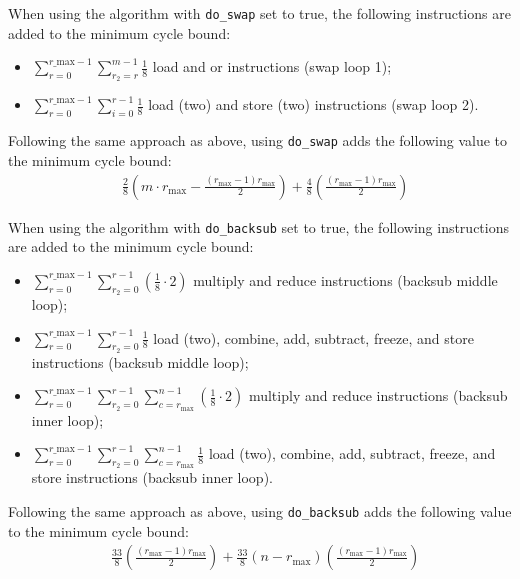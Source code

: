 \documentclass[11pt,a4paper]{report}
\theoremstyle{definition}
\begin{document}
When using the algorithm with \texttt{do\_swap} set to true, the following instructions are added to the minimum cycle bound:
\begin{itemize}
  \item $\sum_{r=0}^{r\_\text{max}-1} \sum_{r_2=r}^{m-1} \frac{1}{8}$ load and or instructions (swap loop 1);
  \item $\sum_{r=0}^{r\_\text{max}-1} \sum_{i=0}^{r-1} \frac{1}{8}$ load (two) and store (two) instructions (swap loop 2).
\end{itemize}
Following the same approach as above, using \texttt{do\_swap} adds the following value to the minimum cycle bound:
\begin{align*}
   & \frac{2}{8} \left( m \cdot r_\text{max} - \frac{(r_\text{max} - 1)r_{\text{max}}}{2} \right) + \frac{4}{8} \left( \frac{(r_\text{max} - 1)r_{\text{max}}}{2} \right)
\end{align*}

When using the algorithm with \texttt{do\_backsub} set to true, the following instructions are added to the minimum cycle bound:
\begin{itemize}
  \item $\sum_{r=0}^{r\_\text{max}-1} \sum_{r_2=0}^{r-1} (\frac{1}{8} \cdot 2)$ multiply and reduce instructions (backsub middle loop);
  \item $\sum_{r=0}^{r\_\text{max}-1} \sum_{r_2=0}^{r-1} \frac{1}{8}$ load (two), combine, add, subtract, freeze, and store instructions (backsub middle loop);
  \item $\sum_{r=0}^{r\_\text{max}-1} \sum_{r_2=0}^{r-1} \sum_{c=r_\text{max}}^{n-1} (\frac{1}{8} \cdot 2)$ multiply and reduce instructions (backsub inner loop);
  \item $\sum_{r=0}^{r\_\text{max}-1} \sum_{r_2=0}^{r-1} \sum_{c=r_\text{max}}^{n-1} \frac{1}{8}$ load (two), combine, add, subtract, freeze, and store instructions (backsub inner loop).
\end{itemize}
Following the same approach as above, using \texttt{do\_backsub} adds the following value to the minimum cycle bound:
\begin{align*}
   & \frac{33}{8} \left( \frac{(r_\text{max} - 1)r_{\text{max}}}{2} \right) + \frac{33}{8} \left( n - r_\text{max} \right) \left( \frac{(r_\text{max} - 1)r_{\text{max}}}{2} \right)
\end{align*}
\end{document}
